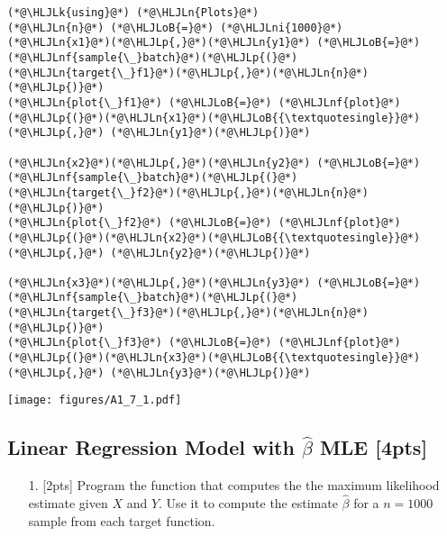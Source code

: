 \documentclass[12pt,a4paper]{article}
\newcommand{\HLJLk}[1]{\textcolor[RGB]{148,91,176}{\textbf{#1}}}
\newcommand{\HLJLn}[1]{#1}
\newcommand{\HLJLnf}[1]{\textcolor[RGB]{66,102,213}{#1}}
\newcommand{\HLJLni}[1]{\textcolor[RGB]{59,151,46}{#1}}
\newcommand{\HLJLoB}[1]{\textcolor[RGB]{102,102,102}{\textbf{#1}}}
\newcommand{\HLJLp}[1]{#1}
\begin{document}
\begin{lstlisting}
(*@\HLJLk{using}@*) (*@\HLJLn{Plots}@*)
(*@\HLJLn{n}@*) (*@\HLJLoB{=}@*) (*@\HLJLni{1000}@*)
(*@\HLJLn{x1}@*)(*@\HLJLp{,}@*)(*@\HLJLn{y1}@*) (*@\HLJLoB{=}@*) (*@\HLJLnf{sample{\_}batch}@*)(*@\HLJLp{(}@*)(*@\HLJLn{target{\_}f1}@*)(*@\HLJLp{,}@*)(*@\HLJLn{n}@*)(*@\HLJLp{)}@*)
(*@\HLJLn{plot{\_}f1}@*) (*@\HLJLoB{=}@*) (*@\HLJLnf{plot}@*)(*@\HLJLp{(}@*)(*@\HLJLn{x1}@*)(*@\HLJLoB{{\textquotesingle}}@*)(*@\HLJLp{,}@*) (*@\HLJLn{y1}@*)(*@\HLJLp{)}@*)

(*@\HLJLn{x2}@*)(*@\HLJLp{,}@*)(*@\HLJLn{y2}@*) (*@\HLJLoB{=}@*) (*@\HLJLnf{sample{\_}batch}@*)(*@\HLJLp{(}@*)(*@\HLJLn{target{\_}f2}@*)(*@\HLJLp{,}@*)(*@\HLJLn{n}@*)(*@\HLJLp{)}@*)
(*@\HLJLn{plot{\_}f2}@*) (*@\HLJLoB{=}@*) (*@\HLJLnf{plot}@*)(*@\HLJLp{(}@*)(*@\HLJLn{x2}@*)(*@\HLJLoB{{\textquotesingle}}@*)(*@\HLJLp{,}@*) (*@\HLJLn{y2}@*)(*@\HLJLp{)}@*)

(*@\HLJLn{x3}@*)(*@\HLJLp{,}@*)(*@\HLJLn{y3}@*) (*@\HLJLoB{=}@*) (*@\HLJLnf{sample{\_}batch}@*)(*@\HLJLp{(}@*)(*@\HLJLn{target{\_}f3}@*)(*@\HLJLp{,}@*)(*@\HLJLn{n}@*)(*@\HLJLp{)}@*)
(*@\HLJLn{plot{\_}f3}@*) (*@\HLJLoB{=}@*) (*@\HLJLnf{plot}@*)(*@\HLJLp{(}@*)(*@\HLJLn{x3}@*)(*@\HLJLoB{{\textquotesingle}}@*)(*@\HLJLp{,}@*) (*@\HLJLn{y3}@*)(*@\HLJLp{)}@*)
\end{lstlisting}

\texttt{[image: figures/A1\_7\_1.pdf]}

\subsection{Linear Regression Model with $\hat \beta$ MLE [4pts]}
\begin{itemize}
\item[1. ] [2pts] Program the function that computes the the maximum likelihood estimate given $X$ and $Y$.  Use it to compute the estimate $\hat \beta$ for a $n=1000$ sample from each target function.

\end{itemize}
\end{document}
